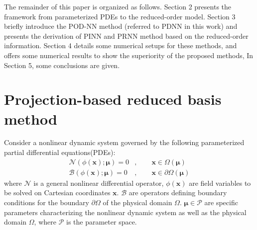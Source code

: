 \documentclass[preprint, 10pt]{elsarticle}
\begin{document}
The remainder of this paper is organized as follows. Section 2 presents the framework from parameterized PDEs to the reduced-order model. Section 3 briefly introduce the POD-NN method (referred to PDNN in this work) and presents the derivation of PINN and PRNN method based on the reduced-order information. Section 4 details some numerical setups for these methods, and offers some numerical results to show the superiority of the proposed methods, In Section 5, some conclusions are given.

\section{Projection-based reduced basis method}\label{sec:POD-G}
Consider a nonlinear dynamic system governed by the following parameterized partial differential equations(PDEs):
\begin{equation}
\begin{aligned}
\mathcal{N}\left(\phi\left(\mathbf{x}\right); \pmb{\mu}\right)=0&,  \qquad \mathbf{x} \in \Omega\left(\pmb{\mu}\right)  \\
\mathcal{B}\left(\phi\left(\mathbf{x}\right); \pmb{\mu}\right)=0&,  \qquad \mathbf{x} \in \partial \Omega\left(\pmb{\mu}\right)
\end{aligned}
\label{eq_GoverningEqs}
\end{equation}
where $\mathcal{N}$ is a general nonlinear differential operator, $\phi\left(\mathbf{x}\right)$ are field variables to be solved on Cartesian coordinates $\mathbf{x}$. $\mathcal{B}$ are operators defining boundary conditions for the boundary $\partial \Omega$ of the physical  domain $\Omega$. $\pmb{\mu} \in \mathcal{P}$ are specific parameters characterizing the nonlinear dynamic system as well as the physical domain $\Omega$, where $\mathcal{P}$ is the parameter space.
\end{document}
